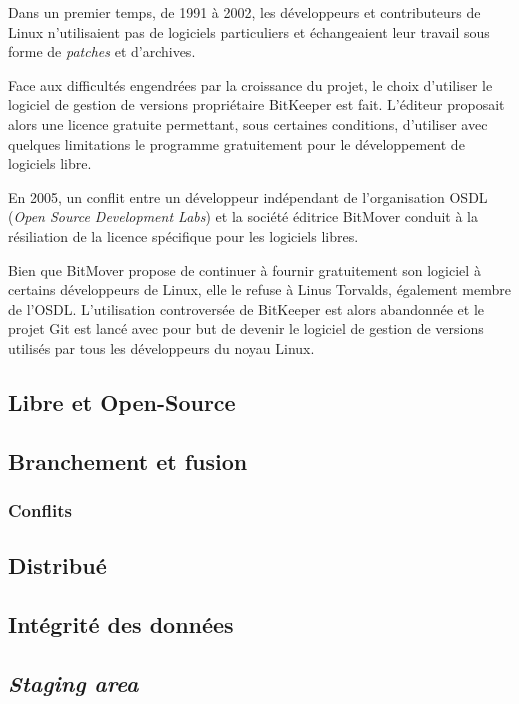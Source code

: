 \documentclass[11pt,a4paper]{article}
\begin{document}
Dans un premier temps, de 1991 à 2002, les développeurs et contributeurs de Linux n'utilisaient pas de logiciels particuliers et échangeaient leur travail sous forme de \textit{patches} et d'archives.

Face aux difficultés engendrées par la croissance du projet, le choix d'utiliser le logiciel de gestion de versions propriétaire BitKeeper est fait.
L'éditeur proposait alors une licence gratuite permettant, sous certaines conditions, d'utiliser avec quelques limitations le programme gratuitement pour le développement de logiciels libre.

En 2005, un conflit entre un développeur indépendant de l'organisation OSDL (\textit{Open Source Development Labs}) et la société éditrice BitMover conduit à la résiliation de la licence spécifique pour les logiciels libres.

Bien que BitMover propose de continuer à fournir gratuitement son logiciel à certains développeurs de Linux, elle le refuse à Linus Torvalds, également membre de l'OSDL.
L'utilisation controversée de BitKeeper est alors abandonnée et le projet Git est lancé avec pour but de devenir le logiciel de gestion de versions utilisés par tous les développeurs du noyau Linux.

\subsection{Libre et Open-Source}

\subsection{Branchement et fusion}

\subsubsection{Conflits}

\subsection{Distribué}

\subsection{Intégrité des données}

\subsection{\textit{Staging area}}
\end{document}
